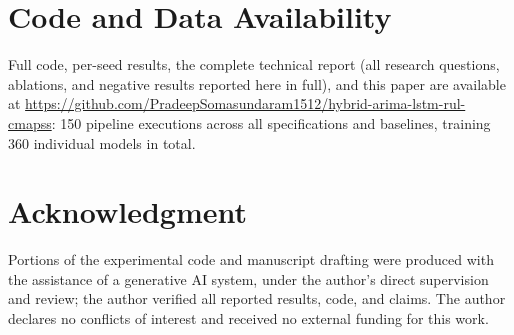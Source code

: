 \documentclass[conference]{IEEEtran}
\newif\ifblind
\begin{document}
\section*{Code and Data Availability}
Full code, per-seed results, the complete technical report (all research questions, ablations, and negative results reported here in full), and this paper are available at \ifblind [repository URL withheld for blind review]\else \url{https://github.com/PradeepSomasundaram1512/hybrid-arima-lstm-rul-cmapss}\fi: 150 pipeline executions across all specifications and baselines, training 360 individual models in total.

\section*{Acknowledgment}
Portions of the experimental code and manuscript drafting were produced with the assistance of a generative AI system, under the author's direct supervision and review; the author verified all reported results, code, and claims. The author declares no conflicts of interest and received no external funding for this work.
\end{document}
